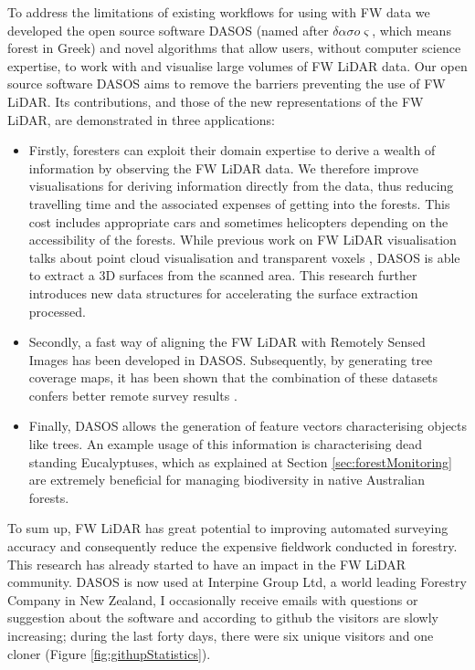 \documentclass{subfiles}
\begin{document}
\par To address the limitations of existing workflows for using with FW data we developed the open source software DASOS (named after $\delta \alpha \sigma o \varsigma$, which means forest in Greek) and novel algorithms that allow users, without computer science expertise, to work with and visualise large volumes of FW LiDAR data. Our open source software DASOS aims to remove the barriers preventing the use of FW LiDAR. Its contributions, and those of the new representations of the FW LiDAR, are demonstrated in three applications:

\begin{itemize}
\item Firstly, foresters can exploit their domain expertise to derive a wealth of information by observing the FW LiDAR data. We therefore improve visualisations for deriving information directly from the data, thus reducing travelling time and the associated expenses of getting into the forests. This cost includes appropriate cars and sometimes helicopters depending on the accessibility of the forests. While previous work on FW LiDAR visualisation talks about point cloud visualisation \cite{Isenburg2012Pulsewaves} and transparent voxels \cite{Persson2005}, {\color{blue} DASOS is able to extract a 3D surfaces from the scanned area. This research further introduces new data structures for accelerating the surface extraction processed. }

\item Secondly, a fast way of aligning the FW LiDAR with Remotely Sensed Images has been developed in DASOS. Subsequently, by generating tree coverage maps, it has been shown that the combination of these datasets confers better remote survey results \cite{Miltiadou2015}.


\item {\color{blue} Finally, DASOS allows the generation of feature vectors characterising objects like trees. An example usage of this information is characterising dead standing Eucalyptuses, which as explained at Section \ref{sec:forestMonitoring} are extremely beneficial for managing biodiversity in native Australian forests. }

\end{itemize}



\par To sum up, FW LiDAR has great potential to improving automated surveying accuracy and consequently reduce the expensive fieldwork conducted in forestry. This research has already started to have an impact in the FW LiDAR community. {\color{blue} DASOS is now used at Interpine Group Ltd, a world leading Forestry Company in New Zealand, I occasionally receive emails with questions or suggestion about the software and according to github the visitors are slowly increasing; during the last forty days, there were six unique visitors and one cloner (Figure \ref{fig:githupStatistics}).}
\end{document}
